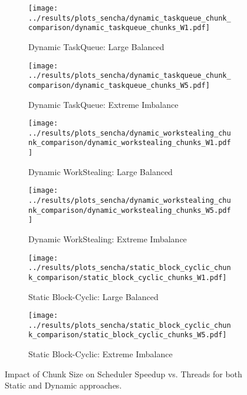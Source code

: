 \documentclass[10pt]{article}
\begin{document}
\begin{figure}[H]
    \centering
    \begin{subfigure}[b]{0.49\textwidth}
        \centering
        \texttt{[image: ../results/plots\_sencha/dynamic\_taskqueue\_chunk\_comparison/dynamic\_taskqueue\_chunks\_W1.pdf]}
        \caption{Dynamic TaskQueue: Large Balanced}
        \label{fig:chunk_impact_dynamic_balanced_TQ}
    \end{subfigure}
    \hfill
    \begin{subfigure}[b]{0.49\textwidth}
        \centering
        \texttt{[image: ../results/plots\_sencha/dynamic\_taskqueue\_chunk\_comparison/dynamic\_taskqueue\_chunks\_W5.pdf]}
        \caption{Dynamic TaskQueue: Extreme Imbalance}
        \label{fig:chunk_impact_dynamic_imbalance_TQ}
    \end{subfigure}

    \vspace{0.5em}

    \begin{subfigure}[b]{0.49\textwidth}
        \centering
        \texttt{[image: ../results/plots\_sencha/dynamic\_workstealing\_chunk\_comparison/dynamic\_workstealing\_chunks\_W1.pdf]}
        \caption{Dynamic WorkStealing: Large Balanced}
        \label{fig:chunk_impact_dynamic_balanced_WS}
    \end{subfigure}
    \hfill
    \begin{subfigure}[b]{0.49\textwidth}
        \centering
        \texttt{[image: ../results/plots\_sencha/dynamic\_workstealing\_chunk\_comparison/dynamic\_workstealing\_chunks\_W5.pdf]}
        \caption{Dynamic WorkStealing: Extreme Imbalance}
        \label{fig:chunk_impact_dynamic_imbalance_WS}
    \end{subfigure}

    \vspace{0.5em}

    \begin{subfigure}[b]{0.49\textwidth}
        \centering
        \texttt{[image: ../results/plots\_sencha/static\_block\_cyclic\_chunk\_comparison/static\_block\_cyclic\_chunks\_W1.pdf]}
        \caption{Static Block-Cyclic: Large Balanced}
        \label{fig:chunk_impact_sbc_balanced}
    \end{subfigure}
    \hfill
    \begin{subfigure}[b]{0.49\textwidth}
        \centering
        \texttt{[image: ../results/plots\_sencha/static\_block\_cyclic\_chunk\_comparison/static\_block\_cyclic\_chunks\_W5.pdf]}
        \caption{Static Block-Cyclic: Extreme Imbalance}
        \label{fig:chunk_impact_sbc_imbalance}
    \end{subfigure}

    \caption{Impact of Chunk Size on Scheduler Speedup vs. Threads for both Static and Dynamic approaches.}
    \label{fig:chunk_impact_combined}
\end{figure}
\end{document}

